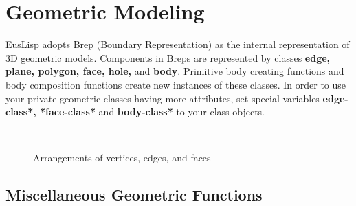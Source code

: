 \newpage
\section{\label{Geometry}Geometric Modeling}

EusLisp adopts {\emx Brep} (Boundary Representation) as the internal
representation of 3D geometric models.
Components in Breps are represented by classes
{\bf edge, plane, polygon, face, hole,} and {\bf body}.
Primitive body creating functions and body composition functions
create new instances of these classes.
In order to use your private geometric classes having
more attributes,
set special variables
{\bf *edge-class*, *face-class*} and {\bf *body-class*}
to your class objects.

\begin{figure}[htb]
\begin{center}
\mbox{
\epsfsize=10cm
}
\end{center}
\caption{Arrangements of vertices, edges, and faces}
\end{figure}

\subsection{Miscellaneous Geometric Functions}

